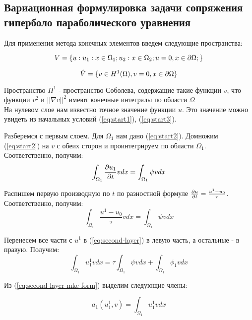 \subsection{Вариационная формулировка задачи сопряжения гиперболо параболического уравнения}

Для применения метода конечных элементов введем следующие пространства:

\begin{equation}
     V = \{u: u_1: x \in \Omega_1; u_2: x \in \Omega_2; u=0, x \in {\partial \Omega};\} 
     \label{eq:v-space}
\end{equation}

\begin{equation}
     \hat{V} = \{v \in H^1(\Omega), v=0, x \in {\partial \Omega} \} 
     \label{eq:v-hat-space}
\end{equation}


Пространство $H^1$ - пространство Соболева, содержащие такие функции $v$,
что функции $v^2$  и $||\nabla v||^2$ имеют конечные интегралы по области $\Omega$ \\

На нулевом слое нам известно точное значение функции $u$. Это значение можно увидеть из начальных условий (\ref{eq:start1}), (\ref{eq:start3}).

Разберемся с первым слоем. Для $\Omega_1$ нам дано (\ref{eq:start2}). Домножим (\ref{eq:start2}) на $v$ с обеих сторон и проинтегрируем по области $\Omega_1$. Соответственно, получим:
$$
    \int_{\Omega_1}{\frac{\partial u_1}{\partial t}}vdx = \int_{\Omega_1}^{}\psi vdx
$$

Распишем первую производную по $t$ по разностной формуле ${\frac{\partial u}{\partial t}} = \frac{u^1 - u_0}{\tau}$. Соответственно, получим:
\begin{equation}
    \int_{\Omega_1}^{}\frac{u^1 - u_0}{\tau}vdx = \int_{\Omega_1}^{}\psi vdx
    \label{eq:second-layer}
\end{equation}

Перенесем все части с $u^1$ в (\ref{eq:second-layer}) в левую часть, а остальные - в правую. Получим:
\begin{equation}
    \int_{\Omega_1}^{}u_1^1 vdx= \tau\int_{\Omega_1}^{}\psi vdx + \int_{\Omega_1}^{}\phi_1 vdx
    \label{eq:second-layer-mke-form}
\end{equation}

Из (\ref{eq:second-layer-mke-form}) выделим следующие члены:

\begin{equation}
    a_1(u_1^1,v) = \int_{\Omega_1}^{}u_1^1 vdx
    \label{eq:second-layer-a}
\end{equation}

